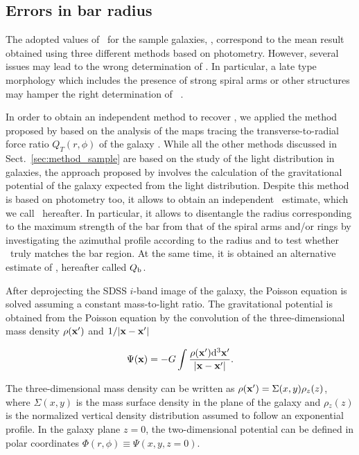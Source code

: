 \documentclass{aa}
\begin{document}
\subsection{Errors in bar radius}

The adopted values of \rbar\ for the sample galaxies, \rmean, correspond to the mean result obtained using three different methods based on photometry. However, several issues may lead to the wrong determination of \rbar. In particular, a late type morphology which includes the presence of strong spiral arms or other structures may hamper the right determination of \rbar\ \citep{Petersen2019,Hilmi2020}. 

In order to obtain an independent method to recover \rbar, we applied the method proposed by \cite{Lee2020} based on the analysis of the maps tracing the transverse-to-radial force ratio $Q_T(r, \phi)$ of the galaxy \citep{Sanders1980,Combes1981}. While all the other methods discussed in Sect.~\ref{sec:method_sample} are based on the study of the light distribution in galaxies, the approach proposed by \cite{Lee2020} involves 
the calculation of the gravitational potential of the galaxy expected from the light distribution. Despite this method is based on photometry too, it allows to obtain an independent \rbar\ estimate, which we call \rqb\ hereafter. In particular, it allows to disentangle the radius corresponding to the maximum strength of the bar from that of the spiral arms and/or rings by investigating the azimuthal profile according to the radius and to test whether \rmean\ truly matches the bar region. At the same time, it is obtained an alternative estimate of \sbar, hereafter called $Q_{\rm b}$. 

After deprojecting the SDSS $i$-band image of the galaxy, the Poisson equation is solved assuming a constant mass-to-light ratio. The gravitational potential is obtained from the Poisson equation by the convolution of the three-dimensional mass density $\rho ({\bf x'})$ and $1/|{\bf x} - \bf x'|$ \citep{Quillen1994,Buta2001}

\begin{equation}
\Psi ({\bf x})=-G \int \frac{\rho ({\bf x'}){\rm d}^3 {\bf x'}}{|{\bf x} - \bf x'|}.
\end{equation}

\noindent The three-dimensional mass density can be written as $\rho ({\bf x'})=\Sigma (x,y) \rho{_z}(z)$, where $\Sigma (x,y)$ is the mass surface density in the plane of the galaxy and $\rho{_z}(z)$ is the normalized vertical density distribution assumed to follow an exponential profile. In the galaxy plane $z=0$, the two-dimensional potential can be defined in polar coordinates $\Phi(r,\phi)\equiv \Psi (x,y,z=0)$.
\end{document}
